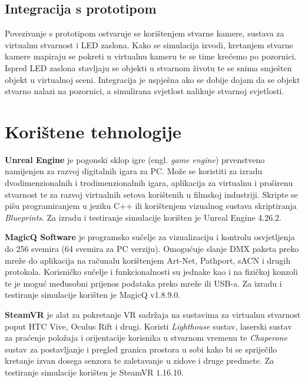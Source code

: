 \documentclass[times, utf8, zavrsni, numeric]{fer}
\begin{document}
\section{Integracija s prototipom}
Povezivanje s prototipom ostvaruje se korištenjem stvarne kamere, sustava za virtualnu stvarnost i LED zaslona. Kako se simulacija izvodi, kretanjem stvarne kamere mapiraju se pokreti u virtualnu kameru te se time krećemo po pozornici. Ispred LED zaslona stavljaju se objekti u stvarnom životu te se snima smješten objekt u virtualnoj sceni. Integracija je uspješna ako se dobije dojam da se objekt stvarno nalazi na pozornici, a simulirana svjetlost nalikuje stvarnoj svjetlosti.

\chapter{Korištene tehnologije}
\textbf{Unreal Engine} \cite{Unreal_Engine} je pogonski sklop igre (engl. \emph{game engine}) prvenstveno namijenjen za razvoj digitalnih igara za PC. Može se koristiti za izradu dvodimenzionalnih i trodimenzionalnih igara, aplikacija za virtualnu i proširenu stvarnost te za razvoj virtualnih setova korištenih u filmskoj industriji. Skripte se pišu programiranjem u jeziku C++ ili korištenjem vizualnog sustava skriptiranja \emph{Blueprints}. 
Za izradu i testiranje simulacije korišten je Unreal Engine 4.26.2. \newline

\textbf{MagicQ Software} \cite{MagicQ_Software} je programsko sučelje za vizualizaciju i kontrolu osvjetljenja do 256 svemira (64 svemira za PC verziju). Omogućuje slanje DMX paketa preko mreže do aplikacija na računalu korištenjem Art-Net, Pathport, sACN i drugih protokola. Korisničko sučelje i funkcionalnosti su jednake kao i na fizičkoj konzoli te je moguć međusobni prijenos podataka preko mreže ili USB-a. 
Za izradu i  testiranje simulacije korišten je MagicQ v1.8.9.0. \newline

\textbf{SteamVR} \cite{SteamVR} je alat za pokretanje VR sadržaja na sustavima za virtualnu stvarnost poput HTC Vive, Oculus Rift i drugi. Koristi \emph{Lighthouse} sustav, laserski sustav za praćenje položaja i orijentacije korisnika u stvarnom vremenu te \emph{Chaperone} sustav za postavljanje i pregled granica prostora u sobi kako bi se spriječilo kretanje izvan dosega senzora te zaletavanje u zidove i druge predmete.
Za testiranje simulacije korišten je SteamVR 1.16.10. \newline
\end{document}
